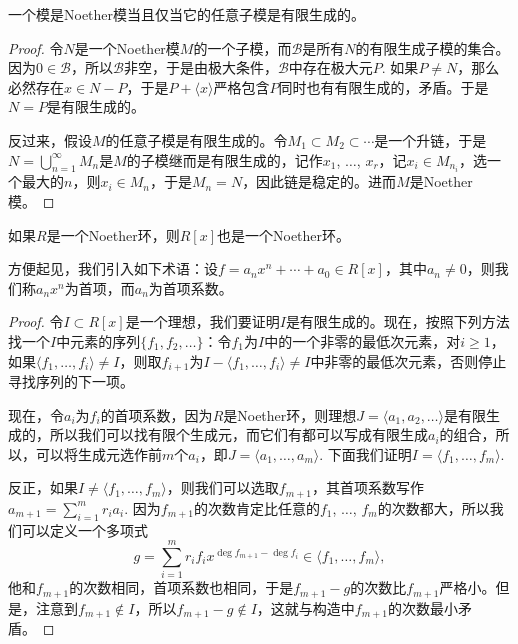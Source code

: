 \begin{pro}
一个模是Noether模当且仅当它的任意子模是有限生成的。
\end{pro}

\begin{proof}
	令$N$是一个Noether模$M$的一个子模，而$\mathscr{B}$是所有$N$的有限生成子模的集合。因为$0\in \mathscr{B}$，所以$\mathscr{B}$非空，于是由极大条件，$\mathscr{B}$中存在极大元$P$. 如果$P\neq N$，那么必然存在$x\in N-P$，于是$P+\langle x\rangle$严格包含$P$同时也有有限生成的，矛盾。于是$N=P$是有限生成的。

	反过来，假设$M$的任意子模是有限生成的。令$M_1\subset M_2\subset \cdots$是一个升链，于是$N=\bigcup_{n=1}^\infty M_n$是$M$的子模继而是有限生成的，记作$x_1$, $\dots$, $x_r$，记$x_i\in M_{n_i}$，选一个最大的$n$，则$x_i\in M_n$，于是$M_n=N$，因此链是稳定的。进而$M$是Noether模。
\end{proof}

\begin{thm}[Hilbert基定理]
如果$R$是一个Noether环，则$R[x]$也是一个Noether环。
\end{thm}

方便起见，我们引入如下术语：设$f=a_nx^n+\cdots+a_0\in R[x]$，其中$a_n\neq 0$，则我们称$a_nx^n$为首项，而$a_n$为首项系数。

\begin{proof}
	令$I\subset R[x]$是一个理想，我们要证明$I$是有限生成的。现在，按照下列方法找一个$I$中元素的序列$\{f_1,f_2,\dots\}$：令$f_1$为$I$中的一个非零的最低次元素，对$i\geq 1$，如果$\langle f_1,\dots,f_i\rangle\neq I$，则取$f_{i+1}$为$I-\langle f_1,\dots,f_i\rangle\neq I$中非零的最低次元素，否则停止寻找序列的下一项。

	现在，令$a_i$为$f_i$的首项系数，因为$R$是Noether环，则理想$J=\langle a_1,a_2,\dots\rangle$是有限生成的，所以我们可以找有限个生成元，而它们有都可以写成有限生成$a_i$的组合，所以，可以将生成元选作前$m$个$a_i$，即$J=\langle a_1,\dots,a_m\rangle$. 下面我们证明$I=\langle f_1,\dots,f_m\rangle$.

	反正，如果$I\neq \langle f_1,\dots,f_m\rangle$，则我们可以选取$f_{m+1}$，其首项系数写作$a_{m+1}=\sum_{i=1}^m r_ia_i$. 因为$f_{m+1}$的次数肯定比任意的$f_1$, $\dots$, $f_m$的次数都大，所以我们可以定义一个多项式
	\[
		g=\sum_{i=1}^m r_if_ix^{\deg f_{m+1}-\deg f_i}\in \langle f_1,\dots,f_m\rangle,
	\]
	他和$f_{m+1}$的次数相同，首项系数也相同，于是$f_{m+1}-g$的次数比$f_{m+1}$严格小。但是，注意到$f_{m+1}\not\in I$，所以$f_{m+1}-g\not\in I$，这就与构造中$f_{m+1}$的次数最小矛盾。
\end{proof}

